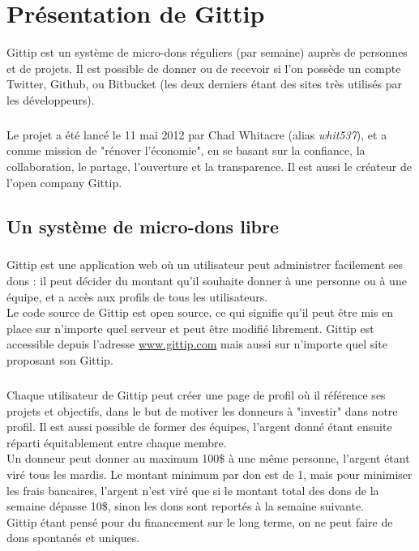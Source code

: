 \chapter{Présentation de Gittip}

Gittip est un système de micro-dons réguliers (par semaine) auprès de
personnes et de projets. Il est possible de donner ou de recevoir si l'on
possède un compte Twitter, Github, ou Bitbucket (les deux derniers étant
des sites très utilisés par les développeurs).

\paragraph{}
Le projet a été lancé le 11 mai 2012 par Chad Whitacre (alias \emph{whit537}),
et a comme mission de "rénover l'économie", en se basant sur la confiance,
la collaboration, le partage, l'ouverture et la transparence.
Il est aussi le créateur de l'open company Gittip.


    \section{Un système de micro-dons libre}

\paragraph{}
Gittip est une application web où un utilisateur peut administrer facilement
ses dons : il peut décider du montant qu'il souhaite donner à une personne
ou à une équipe, et a accès aux profils de tous les utilisateurs.\\
Le code source de Gittip est open source, ce qui signifie qu'il peut être
mis en place sur n'importe quel serveur et peut être modifié librement.
Gittip est accessible depuis l'adresse \url{www.gittip.com} mais aussi sur
n'importe quel site proposant son Gittip.

\paragraph{}
Chaque utilisateur de Gittip peut créer une page de profil où il référence
ses projets et objectifs, dans le but de motiver les donneurs à "investir"
dans notre profil. Il est aussi possible de former des équipes, l'argent
donné étant ensuite réparti équitablement entre chaque membre.\\
Un donneur peut donner au maximum 100\${} à une même personne, l'argent
étant viré tous les mardis. Le montant minimum par don est de 1\textcent, mais
pour minimiser les frais bancaires, l'argent n'est viré que si le montant
total des dons de la semaine dépasse 10\${}, sinon les dons sont reportés à
la semaine suivante.\\
Gittip étant pensé pour du financement sur le long terme, on ne peut faire
de dons spontanés et uniques.

